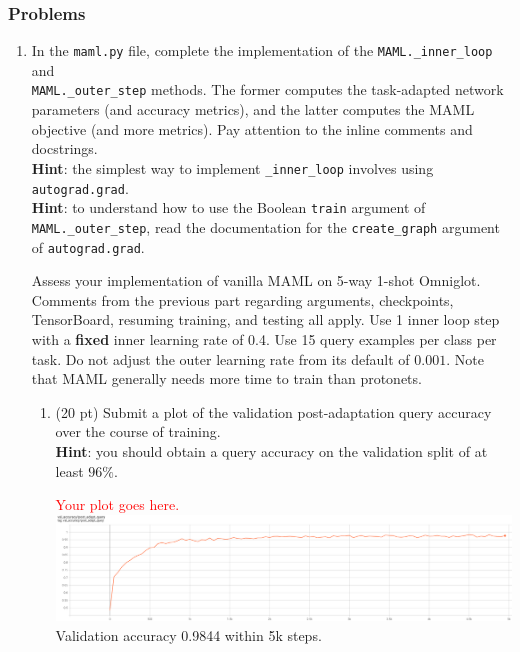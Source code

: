 \documentclass[12pt]{article}
\begin{document}
\subsubsection*{Problems}


\begin{enumerate}
    \item In the \texttt{maml.py} file, complete the implementation of the \texttt{MAML.\_inner\_loop} and \\ \texttt{MAML.\_outer\_step} methods. The former computes the task-adapted network parameters (and accuracy metrics), and the latter computes the MAML objective (and more metrics). Pay attention to the inline comments and docstrings. \\
    \textbf{Hint}: the simplest way to implement \texttt{\_inner\_loop} involves using \texttt{autograd.grad}. \\
    \textbf{Hint}: to understand how to use the Boolean \texttt{train} argument of \texttt{MAML.\_outer\_step}, read the documentation for the \texttt{create\_graph} argument of \texttt{autograd.grad}.
    
    Assess your implementation of vanilla MAML on 5-way 1-shot Omniglot. Comments from the previous part regarding arguments, checkpoints, TensorBoard, resuming training, and testing all apply. Use 1 inner loop step with a \textbf{fixed} inner learning rate of 0.4. Use 15 query examples per class per task. Do not adjust the outer learning rate from its default of $0.001$. Note that MAML generally needs more time to train than protonets.
    \begin{enumerate}
        \newpage
        \item (20 pt) Submit a plot of the validation post-adaptation query accuracy over the course of training. \\
        \textbf{Hint}: you should obtain a query accuracy on the validation split of at least $96\%$.
        
        \textcolor{red}{Your plot goes here.}
        \break
        \includegraphics[width=1.0\linewidth]{figures/maml-5-1-val-acc-query}
        Validation accuracy 0.9844 within 5k steps.
    \end{enumerate}
    

\end{enumerate}
\end{document}

